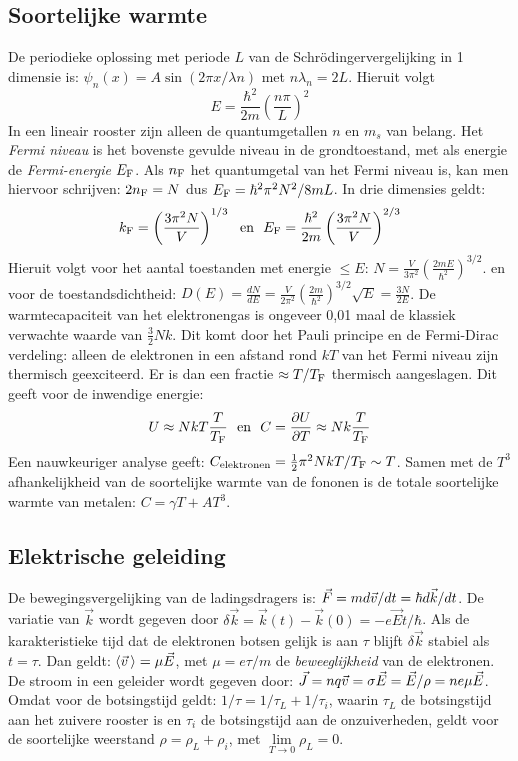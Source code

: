 \subsection{Soortelijke warmte}
De periodieke oplossing met periode $L$ van de Schr\"odingervergelijking in
1 dimensie is:
$\psi_n(x)=A\sin(2\pi x/\lambda n)$ met $n\lambda_n=2L$. Hieruit volgt
\[
E=\frac{\hbar^2}{2m}\left(\frac{n\pi}{L}\right)^2
\]
In een lineair rooster zijn alleen de quantumgetallen $n$ en $m_s$ van
belang. Het {\em Fermi niveau} is het bovenste gevulde niveau in de
grondtoestand, met als energie de {\em Fermi-energie} $E_{\rm F}$. Als
$n_{\rm F}$ het quantumgetal van het Fermi niveau is, kan men hiervoor
schrijven: $2n_{\rm F}=N$ dus $E_{\rm F}=\hbar^2\pi^2 N^2/8mL$. In drie
dimensies geldt:
\[
k_{\rm F}=\left(\frac{3\pi^2N}{V}\right)^{1/3}~~\mbox{en}~~
E_{\rm F}=\frac{\hbar^2}{2m}\left(\frac{3\pi^2N}{V}\right)^{2/3}
\]
Hieruit volgt voor het aantal toestanden met energie $\leq E$:
$\displaystyle N=\frac{V}{3\pi^2}\left(\frac{2mE}{\hbar^2}\right)^{3/2}$.
\npar
en voor de toestandsdichtheid:
$\displaystyle D(E)=\frac{dN}{dE}=\frac{V}{2\pi^2}\left(\frac{2m}{\hbar^2}\right)^{3/2}
\sqrt{E}=\frac{3N}{2E}$.
\npar
De warmtecapaciteit van het elektronengas is ongeveer 0,01 maal de klassiek
verwachte waarde van $\frac{3}{2}Nk$. Dit komt door het Pauli principe en de
Fermi-Dirac verdeling: alleen de elektronen in een afstand rond $kT$ van het
Fermi niveau zijn thermisch geexciteerd. Er is dan een fractie
$\approx T/T_{\rm F}$ thermisch aangeslagen. Dit geeft voor de inwendige energie:
\[
U\approx NkT\frac{T}{T_{\rm F}}~~\mbox{en}~~C=\frac{\partial U}{\partial T}\approx Nk\frac{T}{T_{\rm F}}
\]
Een nauwkeuriger analyse geeft:
$C_{\rm elektronen}=\frac{1}{2}\pi^2NkT/T_{\rm F}\sim T$. Samen met de $T^3$
afhankelijkheid van de soortelijke warmte van de fononen is de totale
soortelijke warmte van metalen: $C=\gamma T+AT^3$.

\subsection{Elektrische geleiding}
De bewegingsvergelijking van de ladingsdragers is:
$\vec{F}=md\vec{v}/dt=\hbar d\vec{k}/dt$. De variatie van $\vec{k}$ wordt gegeven
door $\delta\vec{k}=\vec{k}(t)-\vec{k}(0)=-e\vec{E}t/\hbar$. Als de
karakteristieke tijd dat de elektronen botsen gelijk is aan $\tau$ blijft
$\delta\vec{k}$ stabiel als $t=\tau$. Dan geldt: $\left\langle \vec{v}\, \right\rangle=\mu\vec{E}$,
met $\mu=e\tau/m$ de {\it beweeglijkheid} van de elektronen.
\npar
De stroom in een geleider wordt gegeven door:
$\vec{J}=nq\vec{v}=\sigma\vec{E}=\vec{E}/\rho=ne\mu\vec{E}$. Omdat voor de
botsingstijd geldt: $1/\tau=1/\tau_L+1/\tau_i$, waarin $\tau_L$ de
botsingstijd aan het zuivere rooster is en $\tau_i$ de botsingstijd aan de
onzuiverheden, geldt voor de soortelijke weerstand $\rho=\rho_L+\rho_i$, met
$\lim\limits_{T\rightarrow 0}\rho_L=0$.

